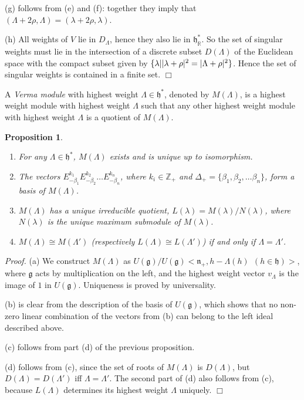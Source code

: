 \documentclass[11pt]{article}
\newtheorem{prop}{Proposition}
\begin{document}
(g) follows from (e) and (f): together they imply that $(\Lambda + 2\rho, \Lambda) = (\lambda + 2\rho, \lambda)$.

(h) All weights of $V$ lie in $D_\Lambda$, hence they also lie in ${\mathfrak h}^*_{\mathbb{R}}$. So the set of singular weights must lie in the intersection of a discrete subset $D(\Lambda)$ of the Euclidean space with the compact subset given by $\{\lambda| \space |\lambda + \rho|^2 = |\Lambda + \rho|^2 \}$. Hence the set of singular weights is contained in a finite set. \hfill $\Box$

A \emph{Verma module} with highest weight $\Lambda \in {\mathfrak h}^*$, denoted by $M(\Lambda)$, is a highest weight module with highest weight $\Lambda$ such that any other highest weight module with highest weight $\Lambda$ is a quotient of $M(\Lambda)$.

\begin{prop}
\begin{enumerate}
\item[(a)] For any $\Lambda \in {\mathfrak h}^*$, $M(\Lambda)$ exists and is unique up to isomorphism.
\item[(b)] The vectors $E_{-\beta_1}^{k_1} E_{-\beta_2}^{k_2} \ldots E_{-\beta_n}^{k_n}$, where $k_i \in \mathbb{Z}_+$ and $\Delta_+ = \{ \beta_1, \beta_2, \ldots \beta_n \}$, form a basis of $M(\Lambda)$.
\item[(c)] $M(\Lambda)$ has a unique irreducible quotient, $L(\lambda) = M(\lambda)/N(\lambda)$, where $N(\lambda)$ is the unique maximum submodule of $M(\lambda)$.
\item[(d)] $M(\Lambda) \cong M(\Lambda ')$ (respectively $L(\Lambda) \cong L(\Lambda')$) if and only if $\Lambda = \Lambda'$.
\end{enumerate}
\end{prop}

\emph{Proof.} (a) We construct $M(\Lambda)$ as $U({\mathfrak g}) / U({\mathfrak g}) <{\mathfrak n}_+, h- \Lambda (h) \ \ (h \in {\mathfrak h})>$, where ${\mathfrak g}$ acts by multiplication on the left, and the highest weight vector $v_\Lambda$ is the image of $1$ in $U({\mathfrak g})$. Uniqueness is proved by universality.

(b) is clear from the description of the basis of $U({\mathfrak g})$, which shows that no non-zero linear combination of the vectors from (b) can belong to the left ideal described above.

(c) follows from part (d) of the previous proposition.

(d) follows from (c), since the set of roots of $M(\Lambda)$ is $D(\Lambda)$, but $D(\Lambda)= D(\Lambda')$ iff $\Lambda = \Lambda'$. The second part of (d) also follows from (c), because $L(\Lambda)$ determines its highest weight $\Lambda$ uniquely. \hfill $\Box$
\end{document}
